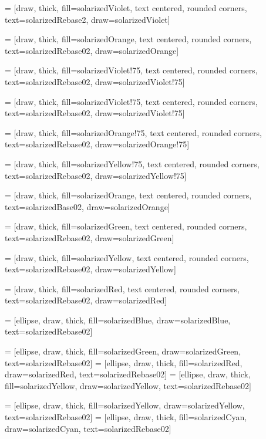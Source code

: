  = [draw, thick, fill=solarizedViolet, text centered, rounded corners,
    text=solarizedRebase2, draw=solarizedViolet]

 = [draw, thick, fill=solarizedOrange, text centered, rounded corners,
    text=solarizedRebase02, draw=solarizedOrange]

 = [draw, thick, fill=solarizedViolet!75, text centered, rounded corners,
    text=solarizedRebase02, draw=solarizedViolet!75]

 = [draw, thick, fill=solarizedViolet!75, text centered, rounded corners,
    text=solarizedRebase02, draw=solarizedViolet!75]

 = [draw, thick, fill=solarizedOrange!75, text centered, rounded corners,
    text=solarizedRebase02, draw=solarizedOrange!75]

 = [draw, thick, fill=solarizedYellow!75, text centered, rounded corners,
    text=solarizedRebase02, draw=solarizedYellow!75]

 = [draw, thick, fill=solarizedOrange, text centered, rounded corners,
text=solarizedBase02, draw=solarizedOrange]

 = [draw, thick, fill=solarizedGreen, text centered, rounded corners,
    text=solarizedRebase02, draw=solarizedGreen]

 = [draw, thick, fill=solarizedYellow, text centered, rounded corners,
    text=solarizedRebase02, draw=solarizedYellow]

 = [draw, thick, fill=solarizedRed, text centered, rounded corners,
    text=solarizedRebase02, draw=solarizedRed]

 = [ellipse, draw, thick, fill=solarizedBlue, draw=solarizedBlue, text=solarizedRebase02]

 = [ellipse, draw, thick, fill=solarizedGreen, draw=solarizedGreen, text=solarizedRebase02]
 = [ellipse, draw, thick, fill=solarizedRed, draw=solarizedRed, text=solarizedRebase02]
 = [ellipse, draw, thick, fill=solarizedYellow, draw=solarizedYellow,
    text=solarizedRebase02]

 = [ellipse, draw, thick, fill=solarizedYellow, draw=solarizedYellow,
    text=solarizedRebase02]
 = [ellipse, draw, thick, fill=solarizedCyan, draw=solarizedCyan, text=solarizedRebase02]


